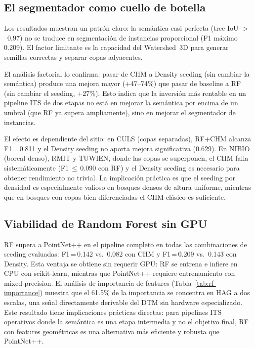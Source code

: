 \documentclass[runningheads]{llncs}
\begin{document}
\subsection{El segmentador como cuello de botella}

Los resultados muestran un patr\'on claro: la sem\'antica casi perfecta (tree IoU $>$~0.97) no se traduce en segmentaci\'on de instancias proporcional (F1 m\'aximo 0.209). El factor limitante es la capacidad del Watershed~3D para generar semillas correctas y separar copas adyacentes.

El an\'alisis factorial lo confirma: pasar de CHM a Density seeding (sin cambiar la sem\'antica) produce una mejora mayor (+47--74\%) que pasar de baseline a RF (sin cambiar el seeding, +27\%). Esto indica que la inversi\'on m\'as rentable en un pipeline ITS de dos etapas no est\'a en mejorar la sem\'antica por encima de un umbral (que RF ya supera ampliamente), sino en mejorar el segmentador de instancias.

El efecto es dependiente del sitio: en CULS (copas separadas), RF+CHM alcanza F1\,=\,0.811 y el Density seeding no aporta mejora significativa (0.629). En NIBIO (boreal denso), RMIT y TUWIEN, donde las copas se superponen, el CHM falla sistem\'aticamente (F1\,$\leq$\,0.090 con RF) y el Density seeding es necesario para obtener rendimiento no trivial. La implicaci\'on pr\'actica es que el seeding por densidad es especialmente valioso en bosques densos de altura uniforme, mientras que en bosques con copas bien diferenciadas el CHM cl\'asico es suficiente.

\subsection{Viabilidad de Random Forest sin GPU}

RF supera a PointNet++ en el pipeline completo en todas las combinaciones de seeding evaluadas: F1\,=\,0.142 vs.\ 0.082 con CHM y F1\,=\,0.209 vs.\ 0.143 con Density. Esta ventaja se obtiene sin requerir GPU: RF se entrena e infiere en CPU con scikit-learn, mientras que PointNet++ requiere entrenamiento con mixed precision. El an\'alisis de importancia de features (Tabla~\ref{tab:rf-importance}) muestra que el 61.5\% de la importancia se concentra en HAG a dos escalas, una se\~nal directamente derivable del DTM sin hardware especializado. Este resultado tiene implicaciones pr\'acticas directas: para pipelines ITS operativos donde la sem\'antica es una etapa intermedia y no el objetivo final, RF con features geom\'etricas es una alternativa m\'as eficiente y robusta que PointNet++.
\end{document}
